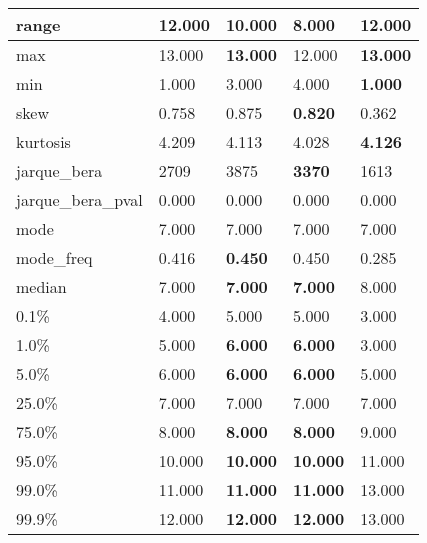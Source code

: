\begin{table}[H]
\begin{tabular}{|l|m{10em}|m{10em}|m{10em}|m{10em}|}
\hline range & 12.000 & 10.000 & \cellcolor[rgb]{0.9, 0.54, 0.52} 8.000 & \bfseries 12.000 \\
\hline max & 13.000 & \bfseries 13.000 & \cellcolor[rgb]{0.9, 0.54, 0.52} 12.000 & \bfseries 13.000 \\
\hline min & 1.000 & 3.000 & \cellcolor[rgb]{0.9, 0.54, 0.52} 4.000 & \bfseries 1.000 \\
\hline skew & 0.758 & 0.875 & \bfseries 0.820 & \cellcolor[rgb]{0.9, 0.54, 0.52} 0.362 \\
\hline kurtosis & 4.209 & 4.113 & \cellcolor[rgb]{0.9, 0.54, 0.52} 4.028 & \bfseries 4.126 \\
\hline jarque\_bera & 2709 & \cellcolor[rgb]{0.9, 0.54, 0.52} 3875 & \bfseries 3370 & 1613 \\
\hline jarque\_bera\_pval & 0.000 & 0.000 & 0.000 & 0.000 \\
\hline mode & 7.000 & 7.000 & 7.000 & 7.000 \\
\hline mode\_freq & 0.416 & \bfseries 0.450 & 0.450 & \cellcolor[rgb]{0.9, 0.54, 0.52} 0.285 \\
\hline median & 7.000 & \bfseries 7.000 & \bfseries 7.000 & \cellcolor[rgb]{0.9, 0.54, 0.52} 8.000 \\
\hline 0.1\% & 4.000 & 5.000 & 5.000 & 3.000 \\
\hline 1.0\% & 5.000 & \bfseries 6.000 & \bfseries 6.000 & \cellcolor[rgb]{0.9, 0.54, 0.52} 3.000 \\
\hline 5.0\% & 6.000 & \bfseries 6.000 & \bfseries 6.000 & \cellcolor[rgb]{0.9, 0.54, 0.52} 5.000 \\
\hline 25.0\% & 7.000 & 7.000 & 7.000 & 7.000 \\
\hline 75.0\% & 8.000 & \bfseries 8.000 & \bfseries 8.000 & \cellcolor[rgb]{0.9, 0.54, 0.52} 9.000 \\
\hline 95.0\% & 10.000 & \bfseries 10.000 & \bfseries 10.000 & \cellcolor[rgb]{0.9, 0.54, 0.52} 11.000 \\
\hline 99.0\% & 11.000 & \bfseries 11.000 & \bfseries 11.000 & \cellcolor[rgb]{0.9, 0.54, 0.52} 13.000 \\
\hline 99.9\% & 12.000 & \bfseries 12.000 & \bfseries 12.000 & \cellcolor[rgb]{0.9, 0.54, 0.52} 13.000 \\
\hline
\end{tabular}
\end{table}
